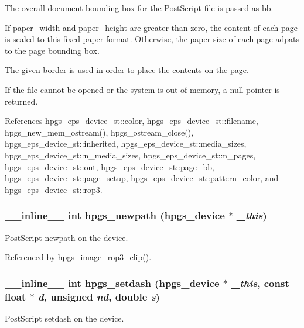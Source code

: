 The overall document bounding box for the PostScript file is passed as {\ttfamily bb}.

If {\ttfamily paper\_\-width} and {\ttfamily paper\_\-height} are greater than zero, the content of each page is scaled to this fixed paper format. Otherwise, the paper size of each page adpats to the page bounding box.

The given {\ttfamily border} is used in order to place the contents on the page.

If the file cannot be opened or the system is out of memory, a null pointer is returned. 

References hpgs\_\-eps\_\-device\_\-st::color, hpgs\_\-eps\_\-device\_\-st::filename, hpgs\_\-new\_\-mem\_\-ostream(), hpgs\_\-ostream\_\-close(), hpgs\_\-eps\_\-device\_\-st::inherited, hpgs\_\-eps\_\-device\_\-st::media\_\-sizes, hpgs\_\-eps\_\-device\_\-st::n\_\-media\_\-sizes, hpgs\_\-eps\_\-device\_\-st::n\_\-pages, hpgs\_\-eps\_\-device\_\-st::out, hpgs\_\-eps\_\-device\_\-st::page\_\-bb, hpgs\_\-eps\_\-device\_\-st::page\_\-setup, hpgs\_\-eps\_\-device\_\-st::pattern\_\-color, and hpgs\_\-eps\_\-device\_\-st::rop3.

\subsubsection[{hpgs\_\-newpath}]{\setlength{\rightskip}{0pt plus 5cm}\_\-\_\-inline\_\-\_\- int hpgs\_\-newpath ({\bf hpgs\_\-device} $\ast$ {\em \_\-this})\hspace{0.3cm}{\ttfamily  [static]}}\label{group__device_ga1554a8f559ab553dc6de4f2be0171e95}
PostScript newpath on the device. 

Referenced by hpgs\_\-image\_\-rop3\_\-clip().

\subsubsection[{hpgs\_\-setdash}]{\setlength{\rightskip}{0pt plus 5cm}\_\-\_\-inline\_\-\_\- int hpgs\_\-setdash ({\bf hpgs\_\-device} $\ast$ {\em \_\-this}, \/  const float $\ast$ {\em d}, \/  unsigned {\em nd}, \/  double {\em s})\hspace{0.3cm}{\ttfamily  [static]}}\label{group__device_gaeb45fb830feaa389fe0aa766fed262d7}
PostScript setdash on the device. 
